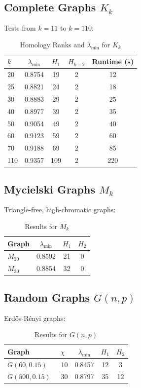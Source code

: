 \documentclass[12pt]{amsart}
\begin{document}
\subsection{Complete Graphs \( K_k \)}
Tests from \( k = 11 \) to \( k = 110 \):
\begin{table}[h]
\caption{Homology Ranks and \( \lambda_{\text{min}} \) for \( K_k \)}
\begin{tabular}{lcccc}
\toprule
\( k \) & \( \lambda_{\text{min}} \) & \( H_1 \) & \( H_{k-2} \) & Runtime (s) \\
\midrule
20 & 0.8754 & 19 & 2 & 12 \\
25 & 0.8821 & 24 & 2 & 18 \\
30 & 0.8883 & 29 & 2 & 25 \\
40 & 0.8977 & 39 & 2 & 35 \\
50 & 0.9054 & 49 & 2 & 40 \\
60 & 0.9123 & 59 & 2 & 60 \\
70 & 0.9188 & 69 & 2 & 85 \\
110 & 0.9357 & 109 & 2 & 220 \\
\bottomrule
\end{tabular}
\end{table}
\subsection{Mycielski Graphs \( M_k \)}
Triangle-free, high-chromatic graphs:
\begin{table}[h]
\caption{Results for \( M_k \)}
\begin{tabular}{lccc}
\toprule
Graph & \( \lambda_{\text{min}} \) & \( H_1 \) & \( H_2 \) \\
\midrule
\( M_{20} \) & 0.8592 & 21 & 0 \\
\( M_{30} \) & 0.8854 & 32 & 0 \\
\bottomrule
\end{tabular}
\end{table}
\subsection{Random Graphs \( G(n, p) \)}
Erdős-Rényi graphs:
\begin{table}[h]
\caption{Results for \( G(n, p) \)}
\begin{tabular}{lcccc}
\toprule
Graph & \( \chi \) & \( \lambda_{\text{min}} \) & \( H_1 \) & \( H_2 \) \\
\midrule
\( G(60, 0.15) \) & ~10 & 0.8457 & 12 & 3 \\
\( G(500, 0.15) \) & ~30 & 0.8797 & 35 & 12 \\
\bottomrule
\end{tabular}
\end{table}
\end{document}
